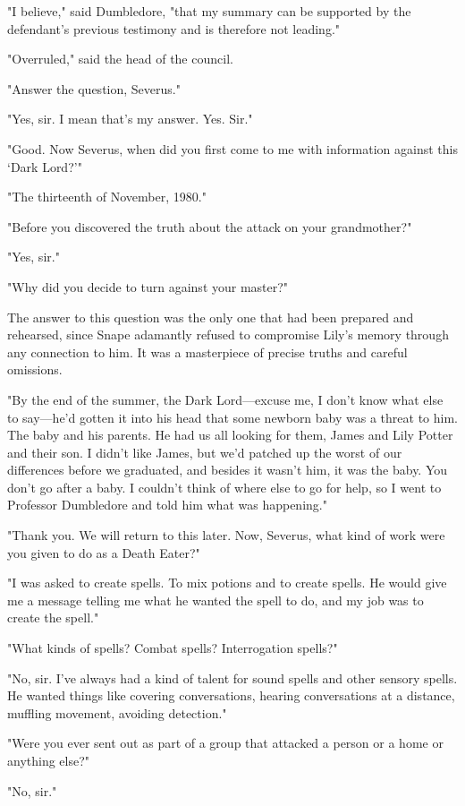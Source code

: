 "I believe," said Dumbledore, "that my summary can be supported by the defendant's previous testimony and is therefore not leading."

"Overruled," said the head of the council.

"Answer the question, Severus."

"Yes, sir. I mean that's my answer. Yes. Sir."

"Good. Now Severus, when did you first come to me with information against this `Dark Lord?'"

"The thirteenth of November, 1980."

"Before you discovered the truth about the attack on your grandmother?"

"Yes, sir."

"Why did you decide to turn against your master?"

The answer to this question was the only one that had been prepared and rehearsed, since Snape adamantly refused to compromise Lily's memory through any connection to him. It was a masterpiece of precise truths and careful omissions.

"By the end of the summer, the Dark Lord—excuse me, I don't know what else to say—he'd gotten it into his head that some newborn baby was a threat to him. The baby and his parents. He had us all looking for them, James and Lily Potter and their son. I didn't like James, but we'd patched up the worst of our differences before we graduated, and besides it wasn't him, it was the baby. You don't go after a baby. I couldn't think of where else to go for help, so I went to Professor Dumbledore and told him what was happening."

"Thank you. We will return to this later. Now, Severus, what kind of work were you given to do as a Death Eater?"

"I was asked to create spells. To mix potions and to create spells. He would give me a message telling me what he wanted the spell to do, and my job was to create the spell."

"What kinds of spells? Combat spells? Interrogation spells?"

"No, sir. I've always had a{\el} kind of talent for sound spells and other sensory spells. He wanted things like covering conversations, hearing conversations at a distance, muffling movement, avoiding detection."

"Were you ever sent out as part of a group that attacked a person or a home or anything else?"

"No, sir."

